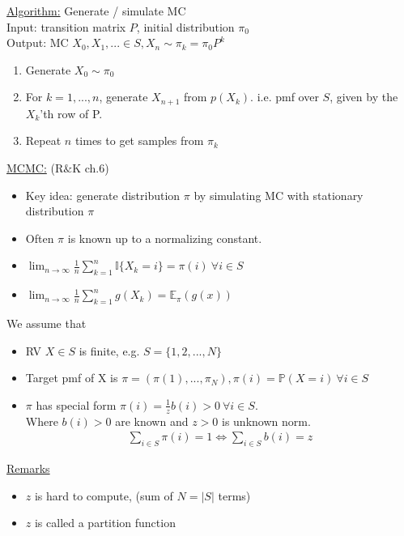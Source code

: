 \documentclass[12pt, letterpaper]{article}
\begin{document}
\noindent \underline{Algorithm:} Generate / simulate MC \\
Input: transition matrix $P$, initial distribution $\pi_0$ \\
Output: MC $X_0, X_1,... \in S, X_n \sim \pi_k = \pi_0P^k$
\begin{enumerate}
    \item Generate $X_0 \sim \pi_0$
    \item For $k=1,...,n$, generate $X_{n+1}$ from $p(X_k)$. i.e. pmf over $S$, given by the $X_k$'th row of P.
    \item Repeat $n$ times to get samples from $\pi_k$
\end{enumerate}

\noindent\underline{MCMC:} (R$\&$K ch.6)
\begin{itemize}
    \item Key idea: generate distribution $\pi$ by simulating MC with stationary distribution $\pi$
    \item Often $\pi$ is known up to a normalizing constant.
    \item $\lim_{n\rightarrow\infty} \frac 1n \sum_{k=1}^{n} \mathbb{I}\{X_k=i\} = \pi(i)\ \forall i \in S$
    \item $\lim_{n\rightarrow\infty} \frac 1n \sum_{k=1}^{n} g(X_k) = \mathbb{E}_\pi (g(x))$
\end{itemize}
We assume that 
\begin{itemize}
    \item RV $X\in S$ is finite, e.g. $S = \{1,2,...,N\}$
    \item Target pmf of X is $\pi = (\pi(1), ...,\pi_N), \pi(i) = \mathbb{P}(X=i)\ \forall i\in S$
    \item $\pi$ has special form $\pi (i) = \frac 1z b(i) > 0 \ \forall i \in S$. \\
    Where $b(i)>0$ are known and $z > 0$ is unknown norm.
    \begin{align*}
        \sum_{i\in S} \pi(i) = 1 \iff \sum_{i \in S} b(i) = z
    \end{align*}
\end{itemize}

\noindent\underline{Remarks}
\begin{itemize}
    \item $z$ is hard to compute, (sum of $N  = |S|$ terms)
    \item $z$ is called a partition function 
\end{itemize}
\end{document}
